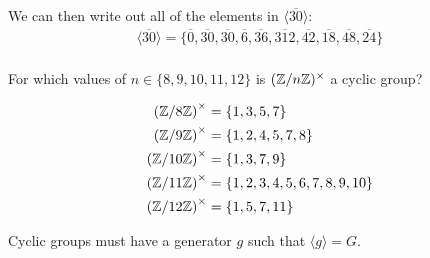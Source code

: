 \begin{problem}
\begin{enumalph}
\begin{Answer}
        \noindent
        We can then write out all of the elements in $\langle \overline{30} \rangle$:
        \begin{align*}
          \langle \overline{30} \rangle = \{ \overline{0}, \overline{30},\overline{30}, \overline{6}, \overline{36}, \overline{312}, \overline{42}, \overline{18}, \overline{48}, \overline{24} \} \\
        \end{align*}
      \end{Answer}
    \item For which values of $n \in \{8,9,10,11,12\}$ is
      $(\mathbb{Z}/n\mathbb{Z})^\times$ a cyclic group?
      \begin{Answer}
        \noindent
        \begin{align*}
          {(\mathbb{Z}/8\mathbb{Z})}^\times &= \{1, 3, 5, 7 \} \\
          {(\mathbb{Z}/9\mathbb{Z})}^\times &= \{1, 2, 4, 5, 7, 8 \} \\
          {(\mathbb{Z}/10\mathbb{Z})}^\times &= \{1, 3, 7, 9 \} \\
          {(\mathbb{Z}/11\mathbb{Z})}^\times &= \{1, 2, 3, 4, 5, 6, 7, 8, 9, 10 \} \\
          {(\mathbb{Z}/12\mathbb{Z})}^\times &= \{1, 5, 7, 11 \} \\
        \end{align*}

        \noindent
        Cyclic groups must have a generator $g$ such that $\langle g \rangle = G$.


\end{Answer}
\end{enumalph}
\end{problem}
